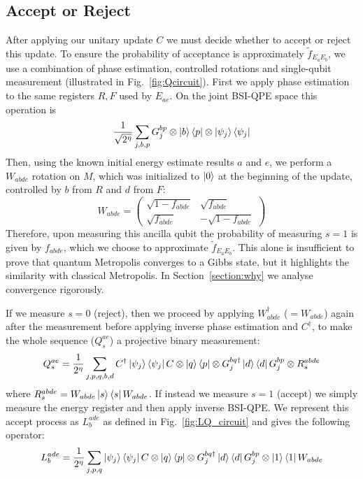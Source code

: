 \documentclass[aps,floatfix,10pt,amssymb,amsfont,amsmath,superscriptaddress,float,nofootinbib,longbibliography,nobalancelastpage,twocolumn]{revtex4-2}
\begin{document}
\subsection{Accept or Reject}
\label{section:acceptprob}
After applying our unitary update $C$ we must decide whether to accept or reject this update. To ensure the probability of acceptance is approximately $\tilde{f}_{E_aE_b}$, we use a combination of phase estimation, controlled rotations and single-qubit measurement (illustrated in Fig.~\ref{fig:Qcircuit}). First we apply phase estimation to the same registers $R, F$ used by $E_{ae}$. On the joint BSI-QPE space this operation is
\begin{equation}
   \frac{1}{\sqrt{2^{\eta}}}\sum_{j,b,p}G_j^{bp}\otimes\ket{b}\bra{p}\otimes\ket{\psi_j}\bra{\psi_j}
\end{equation}
Then, using the known initial energy estimate results $a$ and $e$, we perform a $W_{abde}$ rotation on $M$, which was initialized to $\ket{0}$ at the beginning of the update, controlled by $b$ from $R$ and $d$ from $F$:
\begin{equation}
    W_{abde} = \begin{pmatrix}
        \sqrt{1 - f_{abde}} & \sqrt{f_{abde}}\\
       \sqrt{f_{abde}} & -\sqrt{1 - f_{abde}}
    \end{pmatrix}
\end{equation}
Therefore, upon measuring this ancilla qubit the probability of measuring $s=1$ is given by $f_{abde}$, which we choose to approximate $\tilde f_{E_aE_b}$. This alone is insufficient to prove that quantum Metropolis converges to a Gibbs state, but it highlights the similarity with classical Metropolis. In Section~\ref{section:why} we analyse convergence rigorously.

If we measure $s=0$ (reject), then we proceed by applying $W_{abde}^{\dagger}$ ($=W_{abde}$) again after the measurement before applying inverse phase estimation and $C^{\dagger}$, to make the whole sequence ($Q_s^{ae}$) a projective binary measurement:
\begin{equation} 
    Q_s^{ae} = \frac{1}{2^{\eta}}\sum_{j,p,q,b,d}  C^{\dagger}\ket{\psi_j}\bra{\psi_j}C \otimes \ket{q}\bra{p} \otimes G_j^{bq\dagger}\ket{d}\bra{d}G_j^{bp}\otimes R^{abde}_s
\end{equation}
where $R^{abde}_s = W_{abde}\ket{s}\bra{s}W_{abde}$. If instead we measure $s=1$ (accept) we simply measure the energy register and then apply inverse BSI-QPE. We represent this accept process as $L^{ade}_b$ as defined in Fig.~\ref{fig:LQ_circuit} and gives the following operator:
\begin{equation}
    L^{ade}_b = \frac{1}{2^{\eta}}\sum_{j,p,q}\ket{\psi_j}\bra{\psi_j}C \otimes \ket{q}\bra{p} \otimes G^{bq\dagger}_j \ket{d}\bra{d}G^{bp}_j \otimes \ket{1}\bra{1}W_{abde}
\end{equation}
\end{document}
